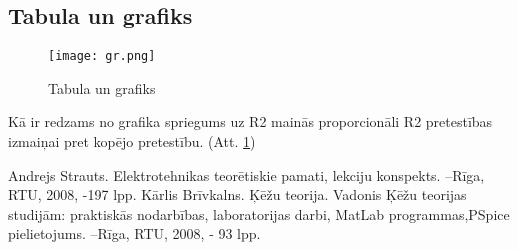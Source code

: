 \documentclass{report}
\begin{document}
\subsection{Tabula un grafiks}
\begin{figure}[!tb]
\texttt{[image: gr.png]}
\caption{Tabula un grafiks}
\label{Tabula un grafiks}
\end{figure}
Kā ir redzams no grafika spriegums uz R2 mainās proporcionāli R2 pretestības izmaiņai pret kopējo pretestību. (Att. \ref{Tabula un grafiks})

\begin{thebibliography}{9}
Andrejs Strauts. Elektrotehnikas teorētiskie pamati, lekciju konspekts. –Rīga,
RTU, 2008, -197 lpp.
Kārlis Brīvkalns. Ķēžu teorija. Vadonis Ķēžu teorijas studijām: praktiskās
nodarbības, laboratorijas darbi, MatLab programmas,PSpice pielietojums. –Rīga,
RTU, 2008, - 93 lpp.
\end{thebibliography}
\end{document}

